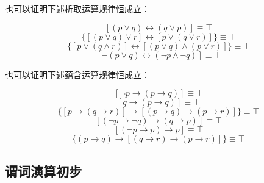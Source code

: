 也可以证明下述析取运算规律恒成立：

\[ [(p \lor q) \leftrightarrow (q \lor p)]                                 \equiv \top \tag{析取交换律} \]
\[ \{[(p \lor q) \lor r] \leftrightarrow [p \lor (q \lor r)]\}             \equiv \top \tag{析取结合律} \]
\[ \{[p \lor (q \land r)] \leftrightarrow [(p \lor q) \land (p \lor r)]\}  \equiv \top \tag{析取分配律} \]
\[ [\lnot(p \lor q) \leftrightarrow (\lnot{}p \land \lnot{}q)]             \equiv \top \tag{析取德·摩根律} \]

也可以证明下述蕴含运算规律恒成立：

\[ [\lnot{}p \to (p \to q)]                                                \equiv \top \tag{否定前件律} \]
\[ [q \to (p \to q)]                                                       \equiv \top \tag{肯定后件律} \]
\[ \{[p \to (q \to r)] \to [(p \to q) \to (p \to r)]\}                     \equiv \top \tag{蕴含分配律} \]
\[ [(\lnot{}p \to \lnot{}q) \to (q \to p)]                                 \equiv \top \tag{蕴含换位律} \]
\[ [(\lnot{}p \to p) \to p]                                                \equiv \top \tag{否定肯定律} \]
\[ \{(p \to q) \to [(q \to r) \to (p \to r)]\}                             \equiv \top \tag{假设三段论} \]

\subsection{谓词演算初步}

